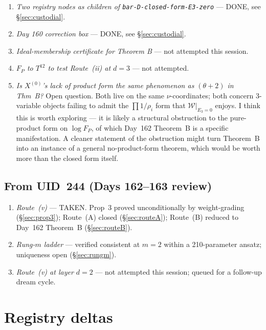 \documentclass[11pt]{amsart}
\newcommand{\W}{\mathcal W}
\newcommand{\FP}{F_P}
\newcommand{\Xtop}{X^{(0)}}
\begin{document}
\begin{enumerate}[leftmargin=2em, label=\arabic*.]
    \item \emph{Two registry nodes as children of \texttt{bar-D-closed-form-E3-zero}} --- DONE, see \S\ref{sec:custodial}.
    \item \emph{Day 160 correction box} --- DONE, see \S\ref{sec:custodial}.
    \item \emph{Ideal-membership certificate for Theorem B} --- not attempted this session.
    \item \emph{$\FP$ to $T^{12}$ to test Route~(ii) at $d = 3$} --- not attempted.
    \item \emph{Is $\Xtop$'s lack of product form the same phenomenon as $(\theta + 2)$ in Thm~B?}
    Open question. Both live on the same $\nu$-coordinates; both concern
    3-variable objects failing to admit the $\prod 1/\rho_i$ form that
    $\W|_{E_3 = 0}$ enjoys. I think this is worth exploring --- it is
    likely a structural obstruction to the pure-product form on
    $\log \FP$, of which Day~162 Theorem~B is a specific manifestation.
    A cleaner statement of the obstruction might turn Theorem~B into an
    instance of a general no-product-form theorem, which would be worth
    more than the closed form itself.
\end{enumerate}

\subsection{From UID~244 (Days 162--163 review)}

\begin{enumerate}[leftmargin=2em, label=(\alph*)]
    \item \emph{Route~(v)} --- TAKEN. Prop~3 proved unconditionally by
    weight-grading (\S\ref{sec:prop3}); Route~(A) closed (\S\ref{sec:routeA});
    Route~(B) reduced to Day~162 Theorem~B (\S\ref{sec:routeB}).
    \item \emph{Rung-$m$ ladder} --- verified consistent at $m = 2$
    within a 210-parameter ansatz; uniqueness open (\S\ref{sec:rungm}).
    \item \emph{Route~(v) at layer $d = 2$} --- not attempted this session;
    queued for a follow-up dream cycle.
\end{enumerate}

\section{Registry deltas}
\label{sec:registry}
\end{document}
